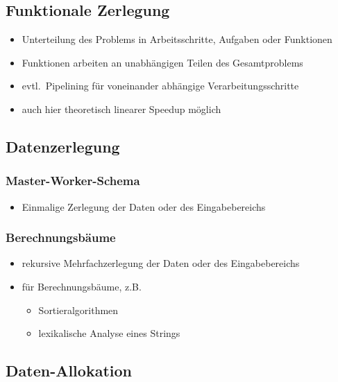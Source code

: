 \documentclass[a4paper, 12pt]{article}
\begin{document}
\subsection{Funktionale Zerlegung}
\begin{itemize}
  \item Unterteilung des Problems in Arbeitsschritte, Aufgaben oder Funktionen
  \item Funktionen arbeiten an unabhängigen Teilen des Gesamtproblems
  \item evtl.\ Pipelining für voneinander abhängige Verarbeitungsschritte
  \item auch hier theoretisch linearer Speedup möglich
\end{itemize}


\subsection{Datenzerlegung}

\subsubsection*{Master-Worker-Schema}
\begin{itemize}
  \item Einmalige Zerlegung der Daten oder des Eingabebereichs
\end{itemize}

\subsubsection*{Berechnungsbäume}
\begin{itemize}
  \item rekursive Mehrfachzerlegung der Daten oder des Eingabebereichs
  \item für Berechnungsbäume, z.B.
    \begin{itemize}
      \item Sortieralgorithmen
      \item lexikalische Analyse eines Strings
    \end{itemize}
\end{itemize}


\subsection{Daten-Allokation}
\end{document}

